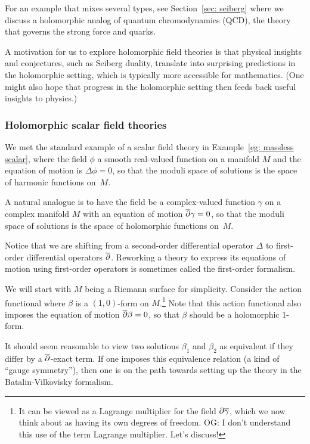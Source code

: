 \documentclass[11pt]{amsart}
\def\del{\partial}
\def\owen#1{{\textcolor{violet!50!black}{OG: {#1}}}}
\begin{document}
For an example that mixes several types, see Section~\ref{sec: seiberg}
where we discuss a holomorphic analog of quantum chromodynamics (QCD), the theory that governs the strong force and quarks.

A motivation for us to explore holomorphic field theories is that physical insights and conjectures, such as Seiberg duality, translate into surprising predictions in the holomorphic setting,
which is typically more accessible for mathematics.
(One might also hope that progress in the holomorphic setting then feeds back useful insights to physics.)

\subsubsection{Holomorphic scalar field theories}

We met the standard example of a scalar field theory in Example~\ref{eg: massless scalar},
where the field $\phi$ a smooth real-valued function on a manifold $M$
and the equation of motion is $\Delta \phi = 0$,
so that the moduli space of solutions is the space of harmonic functions on~$M$.

A natural analogue is to have the field be a complex-valued function $\gamma$ on a complex manifold $M$ with an equation of motion ${\overline{\partial}} \gamma = 0$,
so that the moduli space of solutions is the space of holomorphic functions on~$M$.

Notice that we are shifting from a second-order differential operator $\Delta$ to first-order differential operators ${\overline{\partial}}$.
Reworking a theory to express its equations of motion using first-order operators is sometimes called the first-order formalism.

We will start with $M$ being a Riemann surface for simplicity.
Consider the action functional
\beqn
\label{eqn: 1d betagamma}
\int \beta \wedge \dbar \gamma
\eeqn
where $\beta$ is a $(1,0)$-form on $M$.\footnote{It can be viewed as a Lagrange multiplier for the field $\del \Bar{\gamma}$, 
which we now think about as having its own degrees of freedom. 
\owen{I don't understand this use of the term Lagrange multiplier. Let's discuss!}}
Note that this action functional also imposes the equation of motion ${\overline{\partial}} \beta = 0$,
so that $\beta$ should be a holomorphic $1$-form.

It should seem reasonable to view two solutions $\beta_1$ and $\beta_2$ as equivalent if they differ by a ${\overline{\partial}}$-exact term.
If one imposes this equivalence relation (a kind of ``gauge symmetry''),
then one is on the path towards setting up the theory in the Batalin-Vilkovisky formalism.
\end{document}
